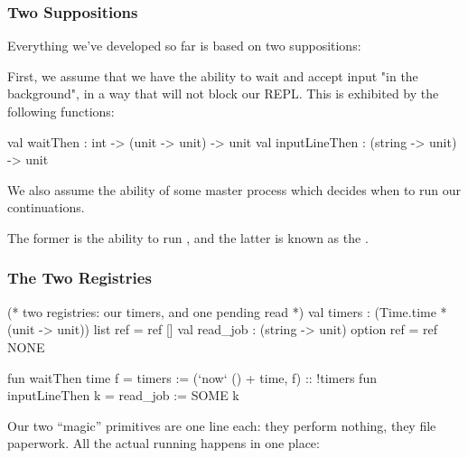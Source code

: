 \documentclass[aspectratio=169]{beamer}
\begin{document}



\begin{frame}[fragile]
  \frametitle{Two Suppositions}

  Everything we've developed so far is based on two suppositions:

  \pause
  \vspace{\fill}

  First, we assume that we have the ability to wait and accept input
  "in the background", in a way that will not block our REPL. This is
  exhibited by the following functions:
  \begin{codeblock}
    val waitThen : int -> (unit -> unit) -> unit
    val inputLineThen : (string -> unit) -> unit
\end{codeblock}

  \pause
  \vspace{\fill}

  We also assume the ability of some master process which decides when
  to run our continuations.

  \pause
  \vspace{\fill}

  The former is the ability to run , and
  the latter is known as the .
\end{frame}

\begin{frame}[fragile]
  \frametitle{The Two Registries}

  \begin{codeblock}
    (* two registries: our timers, and one pending read *)
    val timers : (Time.time * (unit -> unit)) list ref = ref []
    val read_job : (string -> unit) option ref = ref NONE

    fun waitThen time f = timers := (`now` () + time, f) :: !timers
    fun inputLineThen k = read_job := SOME k
\end{codeblock}

  \pause
  \vspace{\fill}

  Our two ``magic'' primitives are one line each: they perform nothing,
  they file paperwork. All the actual running happens in one place:
\end{frame}
\end{document}
